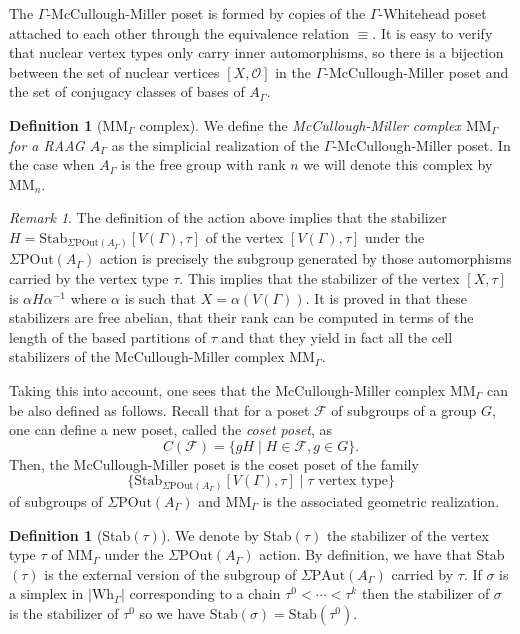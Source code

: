 \documentclass[a4paper]{amsart}
\newcommand{\G}{\Gamma}
\newcommand{\A}{{A_\Gamma}}
\newcommand{\PAut}{\Sigma\mathrm{PAut}}
\newcommand{\POut}{\Sigma\mathrm{POut}}
\newcommand{\MM}{\mathrm{MM}}
\newcommand{\Wh}{\mathrm{Wh}}
\newcommand{\Stab}{\mathrm{Stab}}
\newcommand{\OO}{ \mathcal{O}}
\theoremstyle{definition}
\newtheorem{defi}[teo]{Definition}
\theoremstyle{remark}
\newtheorem*{nota}{Remark}
\begin{document}
The $\G$-McCullough-Miller poset is formed by copies of the $\Gamma$-Whitehead poset attached to each other through the equivalence relation $\equiv$. It is easy to verify that  nuclear vertex types only carry inner automorphisms, so there is a bijection between the set of nuclear vertices $[X,\OO]$ in the $\G$-McCullough-Miller poset and the set of conjugacy classes of bases of $A_\G$. 


\begin{defi}[$\MM_\Gamma$ complex]
    We define the {\sl McCullough-Miller complex $\MM_\G$ for a RAAG $A_\Gamma$} as the simplicial realization of the $\G$-McCullough-Miller poset. In the case when $\A$ is the free group with rank $n$ we will denote this complex by $\MM_n$. \label{def:MM}
\end{defi}

\begin{nota}
The  definition of the action above implies that the stabilizer $H=\Stab_{\POut(\A)}[V(\G),\tau]$  of the vertex $[V(\G),\tau]$ under the $\POut(\A)$ action is precisely the subgroup generated by those automorphisms carried by the vertex type $\tau$. This implies that the stabilizer of the vertex $[X,\tau]$ is $\alpha H\alpha^{-1}$ where $\alpha$ is such that $X=\alpha(V(\G))$. It is proved in \cite[Theorem A]{ArMar}  that these stabilizers are free abelian, that their rank can be computed in terms of the length of the based partitions of $\tau$ and that they yield in fact all the cell stabilizers of the  McCullough-Miller complex $\MM_\G$. 

     Taking this into account, one sees that the McCullough-Miller complex $\MM_\G$ can be also defined as follows. Recall that for a poset $\mathcal{F}$ of subgroups of a group $G$, one can define a new poset, called the {\sl coset poset}, as
$$C(\mathcal{F})=\{gH\mid H\in\mathcal{F},g\in G\}.$$
Then, the McCullough-Miller poset is the coset poset of the family 
$$\{\Stab_{\POut(A_\G)}[V(\G),\tau]\mid \tau\text{ vertex type}\}$$
of subgroups of $\POut(A_\G)$ and $\MM_\G$ is the associated geometric realization. \label{nota:stab}
\end{nota}

\begin{defi}[Stab$(\tau)$]
    We denote by Stab$(\tau)$  the stabilizer of the vertex type $\tau$ of $\MM_\G$ under the $\POut(A_\G)$ action. By definition, we have that Stab$(\tau)$ is the external version of  the subgroup of $\PAut(\A)$ carried by $\tau$. If $\sigma$ is a simplex in $|\Wh_\G|$ corresponding to a chain $\tau^0<\cdots<\tau^k$ then the stabilizer of $\sigma$ is the stabilizer of $\tau^0$ so we have $\Stab(\sigma)=\Stab(\tau^0)$. 
\end{defi}
\end{document}
